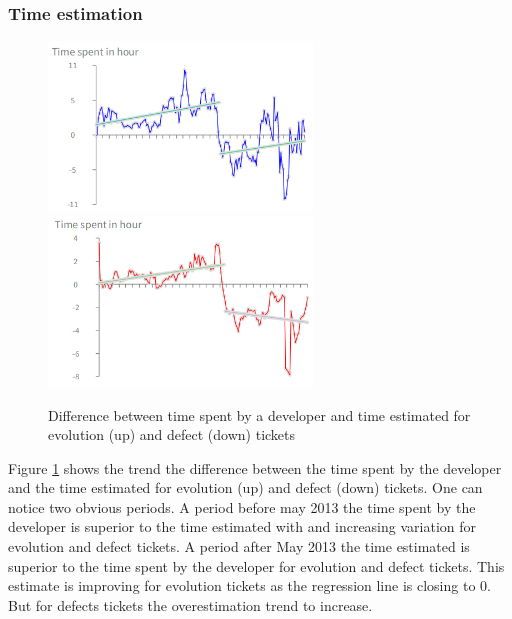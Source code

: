 \documentclass[10pt,conference]{IEEEtran}
\begin{document}
\subsubsection{Time estimation}



\begin{figure}[htbp]
  \centering
  \includegraphics[width=70mm]{./images/estimateEvol.png}\\
  \includegraphics[width=70mm]{./images/estimateBug.png}
    \caption{Difference between time spent by a developer  and time estimated for  evolution (up) and defect (down) tickets}
  \label{fig:devEst}
\end{figure}

Figure \ref{fig:devEst} shows the trend the difference between the time spent by the developer and the time estimated for evolution (up) and defect (down) tickets.
One can notice two obvious periods. 
 A period before may 2013 the time spent by the developer is superior to the time estimated with and increasing variation for evolution and defect tickets. 
 A period after May 2013 the time estimated is superior to the time spent by the developer for evolution and defect tickets. 
 This estimate is improving for evolution tickets as the regression line is closing to 0.
But for defects tickets the overestimation trend to increase.
\end{document}
